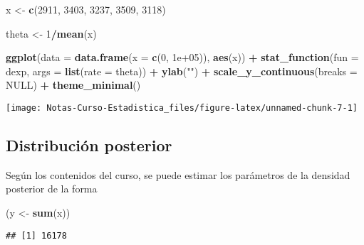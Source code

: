 \documentclass[
  12pt,
]{book}
\newenvironment{Shaded}{\begin{snugshade}}{\end{snugshade}}
\newcommand{\DataTypeTok}[1]{\textcolor[rgb]{0.13,0.29,0.53}{#1}}
\newcommand{\DecValTok}[1]{\textcolor[rgb]{0.00,0.00,0.81}{#1}}
\newcommand{\FloatTok}[1]{\textcolor[rgb]{0.00,0.00,0.81}{#1}}
\newcommand{\KeywordTok}[1]{\textcolor[rgb]{0.13,0.29,0.53}{\textbf{#1}}}
\newcommand{\NormalTok}[1]{#1}
\newcommand{\OperatorTok}[1]{\textcolor[rgb]{0.81,0.36,0.00}{\textbf{#1}}}
\newcommand{\OtherTok}[1]{\textcolor[rgb]{0.56,0.35,0.01}{#1}}
\newcommand{\StringTok}[1]{\textcolor[rgb]{0.31,0.60,0.02}{#1}}
\begin{document}
\begin{Shaded}
\begin{Highlighting}[]
\NormalTok{x \textless{}{-}}\StringTok{ }\KeywordTok{c}\NormalTok{(}\DecValTok{2911}\NormalTok{, }\DecValTok{3403}\NormalTok{, }\DecValTok{3237}\NormalTok{, }\DecValTok{3509}\NormalTok{, }\DecValTok{3118}\NormalTok{)}

\NormalTok{theta \textless{}{-}}\StringTok{ }\DecValTok{1}\OperatorTok{/}\KeywordTok{mean}\NormalTok{(x)}

\KeywordTok{ggplot}\NormalTok{(}\DataTypeTok{data =} \KeywordTok{data.frame}\NormalTok{(}\DataTypeTok{x =} \KeywordTok{c}\NormalTok{(}\DecValTok{0}\NormalTok{, }\FloatTok{1e+05}\NormalTok{)), }\KeywordTok{aes}\NormalTok{(x)) }\OperatorTok{+}\StringTok{ }
\StringTok{    }\KeywordTok{stat\_function}\NormalTok{(}\DataTypeTok{fun =}\NormalTok{ dexp, }\DataTypeTok{args =} \KeywordTok{list}\NormalTok{(}\DataTypeTok{rate =}\NormalTok{ theta)) }\OperatorTok{+}\StringTok{ }
\StringTok{    }\KeywordTok{ylab}\NormalTok{(}\StringTok{""}\NormalTok{) }\OperatorTok{+}\StringTok{ }\KeywordTok{scale\_y\_continuous}\NormalTok{(}\DataTypeTok{breaks =} \OtherTok{NULL}\NormalTok{) }\OperatorTok{+}\StringTok{ }
\StringTok{    }\KeywordTok{theme\_minimal}\NormalTok{()}
\end{Highlighting}
\end{Shaded}

\begin{center}\texttt{[image: Notas-Curso-Estadistica\_files/figure-latex/unnamed-chunk-7-1]} \end{center}

\hypertarget{distribuciuxf3n-posterior}{%
\subsection{Distribución posterior}\label{distribuciuxf3n-posterior}}

Según los contenidos del curso, se puede estimar los parámetros de la densidad posterior de la forma

\begin{Shaded}
\begin{Highlighting}[]
\NormalTok{(y \textless{}{-}}\StringTok{ }\KeywordTok{sum}\NormalTok{(x))}
\end{Highlighting}
\end{Shaded}

\begin{verbatim}
## [1] 16178
\end{verbatim}
\end{document}
